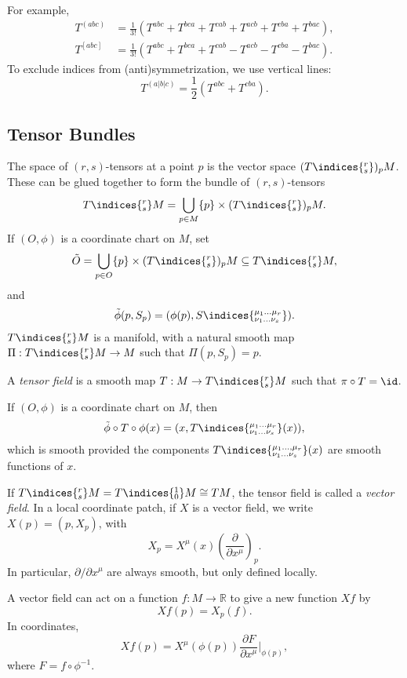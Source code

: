 \documentclass[12pt]{article}
\begin{document}
For example,
\begin{align*}
	T^{(abc)} &= \frac{1}{3!} (T^{abc} + T^{bca} + T^{cab} + T^{acb} + T^{cba} + T^{bac}), \\
	T^{[abc]} &= \frac{1}{3!} (T^{abc} + T^{bca} + T^{cab} - T^{acb} - T^{cba} - T^{bac}).
\end{align*}
To exclude indices from (anti)symmetrization, we use vertical lines:
\[
T^{(a|b|c)} = \frac{1}{2} (T^{abc} + T^{c b a}).
\]
\subsection{Tensor Bundles}%
\label{sub:tense_buns}

The space of $(r, s)$-tensors at a point $p$ is the vector space $(T\indices{^{r}_{s}})_pM$. These can be glued together to form the bundle of $(r, s)$-tensors
\[
	T\indices{^{r}_{s}} M = \bigcup_{p \in M}\{ p\} \times (T\indices{^{r}_{s}} )_p M.
\]
If $(O, \phi)$ is a coordinate chart on $M$, set
\[
	\tilde O = \bigcup_{p \in O} \{p\} \times (T{\indices{^{r}_{s}}})_p M \subseteq T\indices{^{r}_{s}}M,
\]
and
\[
\tilde \phi(p, S_p) = (\phi(p), S\indices{^{\mu_1 \ldots \mu_r}_{\nu_1 \ldots \nu_s}} ).
\]
$T\indices{^{r}_{s}} M$ is a manifold, with a natural smooth map $\Pi : T\indices{^{r}_{s}}M \to M$ such that $\Pi(p, S_p) = p$.

A \emph{tensor field} is a smooth map $T : M \to T\indices{^{r}_{s}}M$ such that $\pi \circ T = \id$.

If $(O, \phi)$ is a coordinate chart on $M$, then
\[
\tilde \phi \circ T \circ \phi(x) = (x, T\indices{^{\mu_1 \ldots \mu_r}_{ \nu_1 \ldots \nu_s}}(x)),
\]
which is smooth provided the components $T\indices{^{\mu_1 \ldots, \mu_r}_{ \nu_1 \ldots \nu_s}}(x)$ are smooth functions of $x$.

\begin{exbox}
	If $T\indices{^{r}_{s}} M = T\indices{^{1}_{0}}M \cong TM$, the tensor field is called a \emph{vector field}. In a local coordinate patch, if $X$ is a vector field, we write $X(p) = (p, X_p)$, with
	\[
	X_p = X^\mu(x) \left( \frac{\partial}{\partial x^\mu} \right)_p.
	\]
	In particular, $\partial / \partial x^\mu$ are always smooth, but only defined locally.
\end{exbox}


A vector field can act on a function $f : M \to \mathbb{R}$ to give a new function $Xf$ by
\[
Xf(p) = X_p(f).
\]
In coordinates,
\[
Xf(p) = X^\mu(\phi(p)) \frac{\partial F}{\partial x^\mu} \biggr|_{\phi(p)},
\]
where $F = f \circ \phi^{-1}$.
\end{document}
